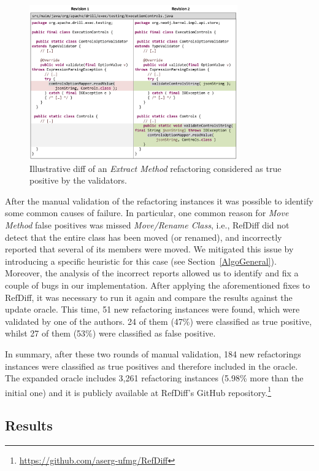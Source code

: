 \begin{figure}[htb]
\centering
\includegraphics[width=0.8\textwidth]{img/diff3.pdf}
\caption{Illustrative diff of an \emph{Extract Method} refactoring considered as true positive by the validators.}
\label{FigDiff3}
\end{figure}

After the manual validation of the refactoring instances it was possible to identify some common causes of failure.
In particular, one common reason for \emph{Move Method} false positives was missed \emph{Move/Rename Class}, i.e., RefDiff did not detect that the entire class has been moved (or renamed), and incorrectly reported that several of its members were moved.
We mitigated this issue by introducing a specific heuristic for this case (see Section~\ref{AlgoGeneral}).
Moreover, the analysis of the incorrect reports allowed us to identify and fix a couple of bugs in our implementation.
After applying the aforementioned fixes to RefDiff, it was necessary to run it again and compare the results against the update oracle. This time, 51 new refactoring instances were found, which were  validated by one of the authors. 24 of them (47\%) were classified as true positive, whilst 27 of them (53\%) were classified as false positive.

In summary, after these two rounds of manual validation, 184 new refactorings instances were classified as true positives and therefore included in the oracle. 
The expanded oracle includes 3,261 refactoring instances (5.98\% more than the initial one) and it is publicly available at RefDiff's GitHub repository.\footnote{\url{https://github.com/aserg-ufmg/RefDiff}}

\subsection{Results}
\label{sec:eval:java:results}

